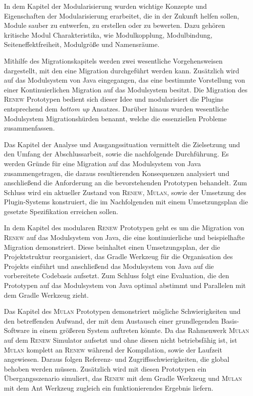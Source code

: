 In dem Kapitel der Modularisierung wurden wichtige Konzepte und Eigenschaften der Modularisierung erarbeitet, die in der Zukunft helfen sollen, Module sauber zu entwerfen, zu erstellen oder zu bewerten. Dazu gehören kritische Modul Charakteristika, wie Modulkopplung, Modulbindung, Seiteneffektfreiheit, Modulgröße und Namensräume. \bigbreak

Mithilfe des Migrationskapitels werden zwei wesentliche Vorgehensweisen dargestellt, mit den eine Migration durchgeführt werden kann. Zusätzlich wird auf das Modulsystem von Java eingegangen, das eine bestimmte Vorstellung von einer Kontinuierlichen Migration auf das Modulsystem besitzt. \newline
Die Migration des \textsc{Renew} Prototypen bedient sich dieser Idee und modularisiert die Plugins entsprechend dem \textit{bottom up} Ansatzes. Darüber hinaus wurden wesentliche Modulsystem Migrationshürden benannt, welche die essenziellen Probleme zusammenfassen. \bigbreak

Das Kapitel der Analyse und Ausgangssituation vermittelt die Zielsetzung und den Umfang der Abschlussarbeit, sowie die nachfolgende Durchführung. Es werden Gründe für eine Migration auf das Modulsystem von Java zusammengetragen, die daraus resultierenden Konsequenzen analysiert und anschließend die Anforderung an die bevorstehenden Prototypen behandelt. Zum Schluss wird ein aktueller Zustand von \textsc{Renew}, \textsc{Mulan}, sowie der Umsetzung des Plugin-Systems konstruiert, die im Nachfolgenden mit einem Umsetzungsplan die gesetzte Spezifikation erreichen sollen.\bigbreak

In dem Kapitel des modularen \textsc{Renew} Prototypen geht es um die Migration von \textsc{Renew} auf das Modulsystem von Java, die eine kontinuierliche und beispielhafte Migration demonstriert. Diese beinhaltet einen Umsetzungsplan, der die Projektstruktur reorganisiert, das Gradle Werkzeug für die Organisation des Projekts einführt und anschließend das Modulsystem von Java auf die vorbereitete Codebasis aufsetzt. Zum Schluss folgt eine Evaluation, die den Prototypen auf das Modulsystem von Java optimal abstimmt und Parallelen mit dem Gradle Werkzeug zieht.\bigbreak

Das Kapitel des \textsc{Mulan} Prototypen demonstriert mögliche Schwierigkeiten und den betreffenden Aufwand, der mit dem Austausch einer grundlegenden Basis-Software in einem größeren System auftreten könnte. Da das Rahmenwerk \textsc{Mulan} auf dem \textsc{Renew} Simulator aufsetzt und ohne diesen nicht betriebsfähig ist, ist \textsc{Mulan} komplett an \textsc{Renew} während der Kompilation, sowie der Laufzeit angewiesen. Daraus folgen Referenz- und Zugriffsschwierigkeiten, die global behoben werden müssen. Zusätzlich wird mit diesen Prototypen ein Übergangsszenario simuliert, das \textsc{Renew} mit dem Gradle Werkzeug und \textsc{Mulan} mit dem Ant Werkzeug zugleich ein funktionierendes Ergebnis liefern. \bigbreak

